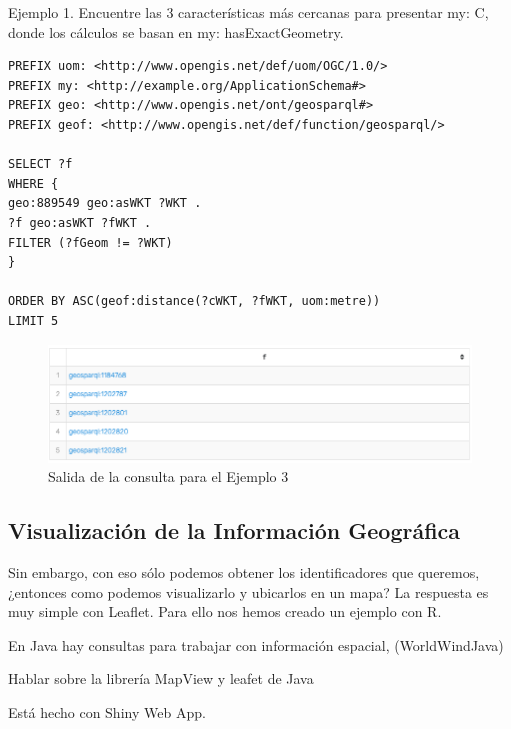 Ejemplo 1. Encuentre las 3 características más cercanas para presentar my: C, donde los cálculos se basan en my: hasExactGeometry.

\begin{lstlisting}
PREFIX uom: <http://www.opengis.net/def/uom/OGC/1.0/>
PREFIX my: <http://example.org/ApplicationSchema#>
PREFIX geo: <http://www.opengis.net/ont/geosparql#>
PREFIX geof: <http://www.opengis.net/def/function/geosparql/>

SELECT ?f
WHERE {
geo:889549 geo:asWKT ?WKT .
?f geo:asWKT ?fWKT .
FILTER (?fGeom != ?WKT)
}

ORDER BY ASC(geof:distance(?cWKT, ?fWKT, uom:metre))
LIMIT 5
\end{lstlisting}

\begin{figure}[H]
	\centering
	\includegraphics[width=0.9\linewidth]{imagenes/capitulo5/salida8}
	\caption{Salida de la consulta para el Ejemplo 3}
	\label{fig:salida8}
\end{figure}













\subsection{Visualización de la Información Geográfica}


Sin embargo, con eso sólo podemos obtener los identificadores que queremos, ¿entonces como podemos visualizarlo y ubicarlos en un mapa? La respuesta es muy simple con Leaflet. Para ello nos hemos creado un ejemplo con R.

En Java hay consultas para trabajar con información espacial, (WorldWindJava)

Hablar sobre la librería MapView y leafet de Java

Está hecho con Shiny Web App.

